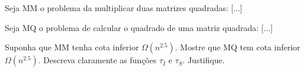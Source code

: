Seja MM o problema da multiplicar duas matrizes quadradas: [...]

Seja MQ o problema de calcular o quadrado de uma matriz quadrada: [...]

Suponha que MM tenha cota inferior $\Omega(n^{2.5})$. Mostre que MQ tem cota inferior $\Omega(n^{2.5})$. Descreva claramente as funções $\tau_I$ e $\tau_S$. Justifique.
